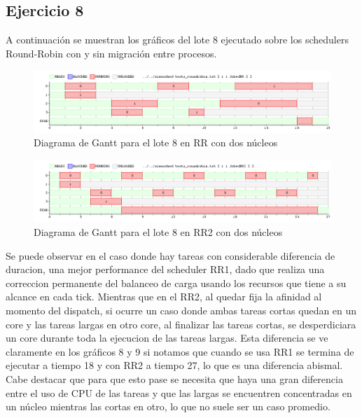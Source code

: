   \subsection{Ejercicio 8}

  A continuaci\'on se muestran los gr\'aficos del lote 8 ejecutado sobre los schedulers Round-Robin con y sin migraci\'on entre procesos.

  \begin{figure}
  \includegraphics[scale=0.32]{images/ej8_RR.png}
  \caption{Diagrama de Gantt para el lote 8 en RR con dos n\'ucleos}
  \end{figure}

  \begin{figure}
  \includegraphics[scale=0.32]{images/ej8_RR2.png}
  \caption{Diagrama de Gantt para el lote 8 en RR2 con dos n\'ucleos}
  \end{figure}

  Se puede observar en el caso donde hay tareas con considerable diferencia de duracion, una mejor performance del scheduler RR1, dado que realiza una correccion permanente del balanceo de carga usando los recursos que tiene a su alcance en cada tick. Mientras que en el RR2, al quedar fija la afinidad al momento del dispatch, si ocurre un caso donde ambas tareas cortas quedan en un core y las tareas largas en otro core, al finalizar las tareas cortas, se desperdiciara un core durante toda la ejecucion de las tareas largas.
  Esta diferencia se ve claramente en los gr\'aficos 8 y 9 si notamos que cuando se usa RR1 se termina de ejecutar a tiempo 18 y con RR2 a tiempo 27, lo que es una diferencia abismal. Cabe destacar que para que esto pase se necesita
  que haya una gran diferencia entre el uso de CPU de las tareas y que las largas se encuentren concentradas en un n\'ucleo mientras las cortas en otro, lo que no suele ser un caso promedio.
